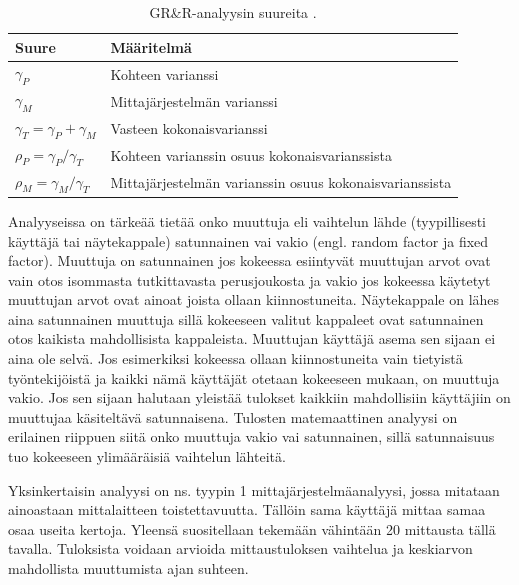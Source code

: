 \documentclass[12pt,a4paper,finnish]{tutthesis}
\begin{document}
\begin{table}[]
\centering
\caption{GR\&R-analyysin suureita \parencite{Burdick2003}.}
\label{table:grr}
\begin{tabular}{@{}ll@{}}
\toprule
Suure                           & Määritelmä                                              \\ \midrule
$\gamma _P$                         & Kohteen varianssi                                       \\
$\gamma _M$                         & Mittajärjestelmän varianssi                             \\
$\gamma _T = \gamma _P + \gamma _M$ & Vasteen kokonaisvarianssi                               \\
$\rho _P = \gamma _P / \gamma _T$   & Kohteen varianssin osuus kokonaisvarianssista           \\
$\rho _M = \gamma _M / \gamma _T$   & Mittajärjestelmän varianssin osuus kokonaisvarianssista
\end{tabular}
\end{table}




Analyyseissa on tärkeää tietää onko muuttuja eli
vaihtelun lähde (tyypillisesti käyttäjä tai näytekappale) satunnainen vai
vakio (engl. random factor ja fixed factor). Muuttuja on satunnainen
jos kokeessa esiintyvät muuttujan arvot ovat vain otos isommasta
tutkittavasta perusjoukosta ja vakio jos kokeessa
käytetyt muuttujan arvot ovat ainoat joista ollaan kiinnostuneita.
Näytekappale on lähes aina satunnainen muuttuja sillä kokeeseen
valitut kappaleet ovat satunnainen otos kaikista mahdollisista kappaleista.
Muuttujan käyttäjä asema sen sijaan ei aina ole selvä. Jos esimerkiksi kokeessa
ollaan kiinnostuneita vain tietyistä työntekijöistä ja kaikki
nämä käyttäjät otetaan kokeeseen mukaan, on muuttuja vakio. Jos sen
sijaan halutaan yleistää tulokset kaikkiin mahdollisiin käyttäjiin on muuttujaa
käsiteltävä satunnaisena. Tulosten matemaattinen analyysi on erilainen riippuen
siitä onko muuttuja vakio vai satunnainen, sillä satunnaisuus tuo kokeeseen
ylimääräisiä vaihtelun lähteitä.


Yksinkertaisin analyysi on ns. tyypin 1 mittajärjestelmäanalyysi, jossa
mitataan ainoastaan mittalaitteen toistettavuutta. Tällöin sama käyttäjä
mittaa samaa osaa useita kertoja. Yleensä suositellaan tekemään
vähintään 20 mittausta tällä tavalla. Tuloksista voidaan arvioida mittaustuloksen
vaihtelua ja keskiarvon mahdollista muuttumista ajan suhteen.
\end{document}
